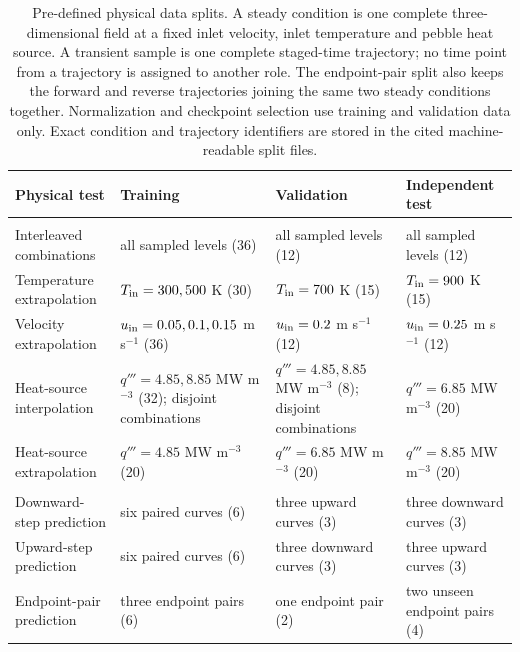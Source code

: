 \begin{table}[!htbp]
\centering
\scriptsize
\setlength{\tabcolsep}{2.5pt}
\caption{Pre-defined physical data splits. A steady condition is one complete three-dimensional field at a fixed inlet velocity, inlet temperature and pebble heat source. A transient sample is one complete staged-time trajectory; no time point from a trajectory is assigned to another role. The endpoint-pair split also keeps the forward and reverse trajectories joining the same two steady conditions together. Normalization and checkpoint selection use training and validation data only. Exact condition and trajectory identifiers are stored in the cited machine-readable split files.}
\label{tab:physical_data_splits}
\begin{tabular}{>{\raggedright\arraybackslash}p{2.6cm}>{\raggedright\arraybackslash}p{3.2cm}>{\raggedright\arraybackslash}p{3.2cm}>{\raggedright\arraybackslash}p{3.2cm}}
\toprule
Physical test & Training & Validation & Independent test \\
\midrule
\multicolumn{4}{l}{\textit{Steady three-dimensional fields}} \\
Interleaved combinations & all sampled levels (36) & all sampled levels (12) & all sampled levels (12) \\
Temperature extrapolation & $T_{\rm in}=300, 500$ K (30) & $T_{\rm in}=700$ K (15) & $T_{\rm in}=900$ K (15) \\
Velocity extrapolation & $u_{\rm in}=0.05, 0.1, 0.15$ m s$^{-1}$ (36) & $u_{\rm in}=0.2$ m s$^{-1}$ (12) & $u_{\rm in}=0.25$ m s$^{-1}$ (12) \\
Heat-source interpolation & $q'''=4.85, 8.85$ MW m$^{-3}$ (32); disjoint combinations & $q'''=4.85, 8.85$ MW m$^{-3}$ (8); disjoint combinations & $q'''=6.85$ MW m$^{-3}$ (20) \\
Heat-source extrapolation & $q'''=4.85$ MW m$^{-3}$ (20) & $q'''=6.85$ MW m$^{-3}$ (20) & $q'''=8.85$ MW m$^{-3}$ (20) \\
\midrule
\multicolumn{4}{l}{\textit{Complete thermal-step trajectories}} \\
Downward-step prediction & six paired curves (6) & three upward curves (3) & three downward curves (3) \\
Upward-step prediction & six paired curves (6) & three downward curves (3) & three upward curves (3) \\
Endpoint-pair prediction & three endpoint pairs (6) & one endpoint pair (2) & two unseen endpoint pairs (4) \\
\bottomrule
\end{tabular}
\end{table}
